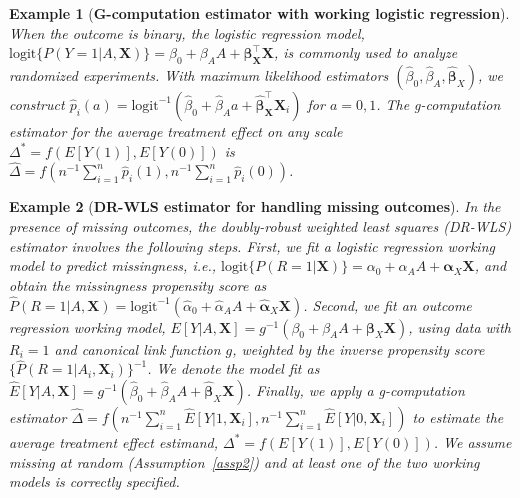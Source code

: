 \documentclass[12pt]{article}
\newtheorem{example}{Example}
\newcommand{\bX}{\boldsymbol{X}}\newcommand{\bO}{\boldsymbol{O}}
\newcommand{\balpha}{\boldsymbol{\alpha}}
\newcommand{\bbeta}{\boldsymbol{\beta}}
\begin{document}
\begin{example}[\textbf{G-computation estimator with working logistic regression}]\label{eg:gcomp}
When the outcome is binary, the logistic regression model, $\text{logit}\{P(Y=1|A,\bX)\} = \beta_0 + \beta_AA + \bbeta_{\bX}^\top \bX$, is commonly used to analyze randomized experiments. With maximum likelihood estimators $(\widehat\beta_0, \widehat\beta_A, \widehat{\bbeta}_X)$, we construct $\widehat{p}_i(a) = \text{logit}^{-1}(\widehat{\beta}_0 + \widehat{\beta}_Aa + \widehat{\bbeta}_{\bX}^\top \bX_i)$ for $a = 0,1$. The g-computation estimator for the average treatment effect on any scale $\Delta^*=f(E[Y(1)], E[Y(0)])$ is $\widehat{\Delta} = f(n^{-1}\sum_{i=1}^n \widehat{p}_i(1), n^{-1}\sum_{i=1}^n \widehat{p}_i(0))$. 
\end{example}


\begin{example}[\textbf{DR-WLS estimator for handling missing outcomes}]\label{eg:dr}
In the presence of missing outcomes, the doubly-robust weighted least squares (DR-WLS) estimator involves the following steps. First, we fit a logistic regression working model to predict missingness, i.e., $\text{logit}\{P(R=1|\bX)\} = \alpha_0 + \alpha_A A + \balpha_X \bX$, and obtain the missingness propensity score as $\widehat{P}(R=1|A,\bX) = \text{logit}^{-1}(\widehat{\alpha}_0 + \widehat{\alpha}_A A + \widehat{\balpha}_X \bX)$. Second, we fit an outcome regression working model, $E[Y|A,\bX] = g^{-1}(\beta_0 + \beta_A A + \bbeta_X \bX)$, using data with $R_i=1$ and canonical link function $g$, weighted by the inverse propensity score $\{\widehat{P}(R=1|A_i, \bX_i)\}^{-1}$. We denote the model fit as $\widehat{E}[Y|A,\bX] = g^{-1}(\widehat{\beta}_0 + \widehat{\beta}_A A + \widehat{\bbeta}_X \bX)$. Finally, we apply a g-computation estimator $\widehat{\Delta} = f\left(n^{-1}\sum_{i=1}^n \widehat{E}[Y|1,\bX_i], n^{-1}\sum_{i=1}^n \widehat{E}[Y|0,\bX_i]\right)$ to estimate the average treatment effect estimand, $\Delta^*=f(E[Y(1)], E[Y(0)])$. We assume missing at random (Assumption~\ref{assp2}) and at least one of the two working models is correctly specified.
\end{example}
\end{document}
